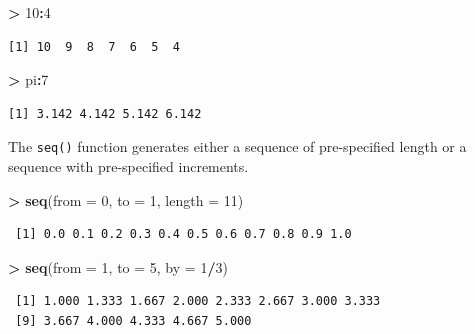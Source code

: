 \documentclass[]{krantz}
\makeatletter
\newenvironment{Shaded}{\begin{snugshade}}{\end{snugshade}}
\newcommand{\DataTypeTok}[1]{\textcolor[rgb]{0.27,0.27,0.27}{#1}}
\newcommand{\DecValTok}[1]{\textcolor[rgb]{0.06,0.06,0.06}{#1}}
\newcommand{\KeywordTok}[1]{\textcolor[rgb]{0.27,0.27,0.27}{\textbf{#1}}}
\newcommand{\NormalTok}[1]{#1}
\newcommand{\OperatorTok}[1]{\textcolor[rgb]{0.43,0.43,0.43}{\textbf{#1}}}
\newcommand{\StringTok}[1]{\textcolor[rgb]{0.5,0.5,0.5}{#1}}
\newenvironment{kframe}{%
\medskip{}
\setlength{\fboxsep}{.8em}
 \def\at@end@of@kframe{}%
 \ifinner\ifhmode%
  \def\at@end@of@kframe{\end{minipage}}%
  \begin{minipage}{\columnwidth}%
 \fi\fi%
 \def\FrameCommand##1{\hskip\@totalleftmargin \hskip-\fboxsep
 \colorbox{shadecolor}{##1}\hskip-\fboxsep
     \hskip-\linewidth \hskip-\@totalleftmargin \hskip\columnwidth}%
 \MakeFramed {\advance\hsize-\width
   \@totalleftmargin\z@ \linewidth\hsize
   \@setminipage}}%
 {\par\unskip\endMakeFramed%
 \at@end@of@kframe}
\renewenvironment{Shaded}{\begin{kframe}}{\end{kframe}}
\makeatother
\begin{document}
\begin{Shaded}
\begin{Highlighting}[]
\OperatorTok{>}\StringTok{ }\DecValTok{10}\OperatorTok{:}\DecValTok{4}
\end{Highlighting}
\end{Shaded}

\begin{verbatim}
[1] 10  9  8  7  6  5  4
\end{verbatim}

\begin{Shaded}
\begin{Highlighting}[]
\OperatorTok{>}\StringTok{ }\NormalTok{pi}\OperatorTok{:}\DecValTok{7}
\end{Highlighting}
\end{Shaded}

\begin{verbatim}
[1] 3.142 4.142 5.142 6.142
\end{verbatim}

The \texttt{seq()} function generates either a sequence of pre-specified length or a sequence with pre-specified increments.

\begin{Shaded}
\begin{Highlighting}[]
\OperatorTok{>}\StringTok{ }\KeywordTok{seq}\NormalTok{(}\DataTypeTok{from =} \DecValTok{0}\NormalTok{, }\DataTypeTok{to =} \DecValTok{1}\NormalTok{, }\DataTypeTok{length =} \DecValTok{11}\NormalTok{)}
\end{Highlighting}
\end{Shaded}

\begin{verbatim}
 [1] 0.0 0.1 0.2 0.3 0.4 0.5 0.6 0.7 0.8 0.9 1.0
\end{verbatim}

\begin{Shaded}
\begin{Highlighting}[]
\OperatorTok{>}\StringTok{ }\KeywordTok{seq}\NormalTok{(}\DataTypeTok{from =} \DecValTok{1}\NormalTok{, }\DataTypeTok{to =} \DecValTok{5}\NormalTok{, }\DataTypeTok{by =} \DecValTok{1}\OperatorTok{/}\DecValTok{3}\NormalTok{)}
\end{Highlighting}
\end{Shaded}

\begin{verbatim}
 [1] 1.000 1.333 1.667 2.000 2.333 2.667 3.000 3.333
 [9] 3.667 4.000 4.333 4.667 5.000
\end{verbatim}
\end{document}

